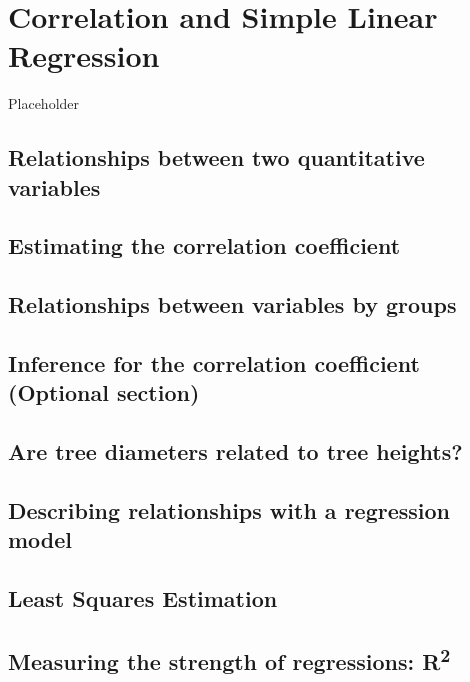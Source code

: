 \documentclass[]{book}
\begin{document}
\hypertarget{chapter6}{%
\chapter{Correlation and Simple Linear Regression}\label{chapter6}}

Placeholder

\hypertarget{section6-1}{%
\section{Relationships between two quantitative variables}\label{section6-1}}

\hypertarget{section6-2}{%
\section{Estimating the correlation coefficient}\label{section6-2}}

\hypertarget{section6-3}{%
\section{Relationships between variables by groups}\label{section6-3}}

\hypertarget{section6-4}{%
\section{Inference for the correlation coefficient (Optional section)}\label{section6-4}}

\hypertarget{section6-5}{%
\section{Are tree diameters related to tree heights?}\label{section6-5}}

\hypertarget{section6-6}{%
\section{Describing relationships with a regression model}\label{section6-6}}

\hypertarget{section6-7}{%
\section{Least Squares Estimation}\label{section6-7}}

\hypertarget{section6-8}{%
\section{\texorpdfstring{Measuring the strength of regressions: R\textsuperscript{2}}{Measuring the strength of regressions: R2}}\label{section6-8}}
\end{document}
